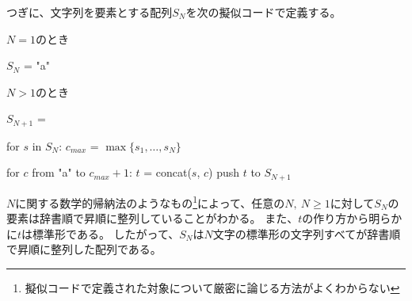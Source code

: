 \documentclass{article}
\begin{document}
\newpage

つぎに、文字列を要素とする配列$S_N$を次の擬似コードで定義する。

$N = 1$のとき
\begin{pseudo}
$S_N$ = { "a" }
\end{pseudo}

$N > 1$のとき
\begin{pseudo}
$S_{N+1}$ = {}

for $s$ in $S_N$:
    $c_{max}$ = $\max\{s_1, \dots, s_N\}$

    for $c$ from "a" to $c_{max} + 1$:
        $t$ = concat($s$, $c$)
        push $t$ to $S_{N+1}$
\end{pseudo}

$N$に関する数学的帰納法のようなもの\footnote{擬似コードで定義された対象について厳密に論じる方法がよくわからない}によって、任意の$N,\ N \geq 1$に対して$S_N$の要素は辞書順で昇順に整列していることがわかる。
また、$t$の作り方から明らかに$t$は標準形である。
したがって、$S_N$は$N$文字の標準形の文字列すべてが辞書順で昇順に整列した配列である。
\end{document}
